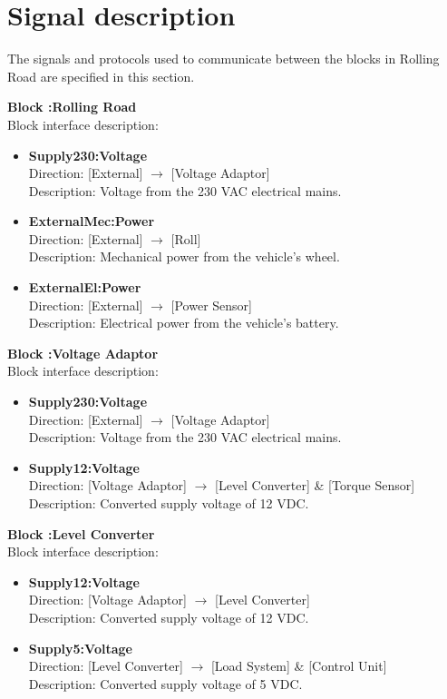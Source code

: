  \section{Signal description}
The signals and protocols used to communicate between the blocks in Rolling Road are specified in this section.

\textbf{Block :Rolling Road}\\
Block interface description:
\begin{itemize}
	\item \textbf{Supply230:Voltage}\\
	Direction: [External] $\rightarrow$ [Voltage Adaptor]\\
	Description: Voltage from the 230 VAC electrical mains.
	\item \textbf{ExternalMec:Power}\\
	Direction: [External] $\rightarrow$ [Roll]\\
	Description: Mechanical power from the vehicle's wheel.
	\item \textbf{ExternalEl:Power}\\
	Direction: [External] $\rightarrow$ [Power Sensor]\\
	Description: Electrical power from the vehicle's battery.
\end{itemize}
	
\textbf{Block :Voltage Adaptor}\\
Block interface description:
\begin{itemize}
	\item \textbf{Supply230:Voltage}\\
	Direction: [External] $\rightarrow$ [Voltage Adaptor]\\
	Description: Voltage from the 230 VAC electrical mains.
	\item \textbf{Supply12:Voltage}\\
	Direction: [Voltage Adaptor] $\rightarrow$ [Level Converter] \& [Torque Sensor]\\
	Description: Converted supply voltage of 12 VDC.
\end{itemize}
		
\textbf{Block :Level Converter}\\
Block interface description:
\begin{itemize}
	\item \textbf{Supply12:Voltage}\\
	Direction: [Voltage Adaptor] $\rightarrow$ [Level Converter]\\
	Description: Converted supply voltage of 12 VDC.
	\item \textbf{Supply5:Voltage}\\
	Direction: [Level Converter] $\rightarrow$ [Load System] \& [Control Unit]\\
	Description: Converted supply voltage of 5 VDC.
\end{itemize}
			

